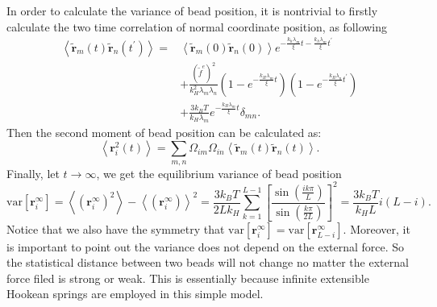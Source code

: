 In order to calculate the variance of bead position, it is nontrivial to firstly calculate the two time correlation of normal coordinate position, as following
\begin{equation}
    \begin{aligned}
    \label{eq:correlationTransformedPos}
    \left<\tilde{\mathbf{r}}_m(t)\tilde{\mathbf{r}}_n(t^{\prime})\right> = &
    \left<\tilde{\mathbf{r}}_m(0)\tilde{\mathbf{r}}_n(0)\right>
    e^{-\frac{k_h\lambda_m}{\xi}t-\frac{k_h\lambda_m}{\xi}t^{\prime}}  \\
    & + \frac{(\tilde{f}^e)^2}{k_H^2\lambda_m\lambda_n}
    \left(1 - e^{-\frac{k_H\lambda_m}{\xi} t} \right)
    \left(1 - e^{-\frac{k_H\lambda_n}{\xi} t^{\prime}} \right) \\
    & + \frac{3k_B T}{k_H\lambda_m}e^{-\frac{k_H\lambda_m}{\xi}t}\delta_{mn}.
    \end{aligned}
\end{equation}
Then the second moment of bead position can be calculated as:
\begin{equation}
    \label{eq:secondMoment}
    \left<\mathbf{r}_i^2(t)\right> = \sum_{m,n}\Omega_{im}\Omega_{in}
    \left<\tilde{\mathbf{r}}_m(t)\tilde{\mathbf{r}}_n(t)\right>.
\end{equation}
Finally, let $t\rightarrow\infty$, we get the equilibrium variance of bead position
\begin{equation}
    \label{eq:beadVariance}
    \text{var}\left[\mathbf{r}_i^{\infty}\right] =
    \left<(\mathbf{r}_i^{\infty})^2\right> - \left<(\mathbf{r}_i^{\infty})\right>^2 
    = \frac{3k_B T}{2 L k_H}\sum_{k=1}^{L-1}\left[ \frac{\sin\left(\frac{ik\pi}{L}\right)}
        {\sin\left(\frac{k\pi}{2L}\right)} \right]^2
    = \frac{3k_B T}{k_H L} i(L-i).
\end{equation}
Notice that we also have the symmetry that $\text{var}\left[\mathbf{r}_i^{\infty}\right] = \text{var}\left[\mathbf{r}_{L-i}^{\infty}\right]$. Moreover, it is important to point out the variance does not depend on the external force. So the statistical distance between two beads will not change no matter the external force filed is strong or weak. This is essentially because infinite extensible Hookean springs are employed in this simple model. 


